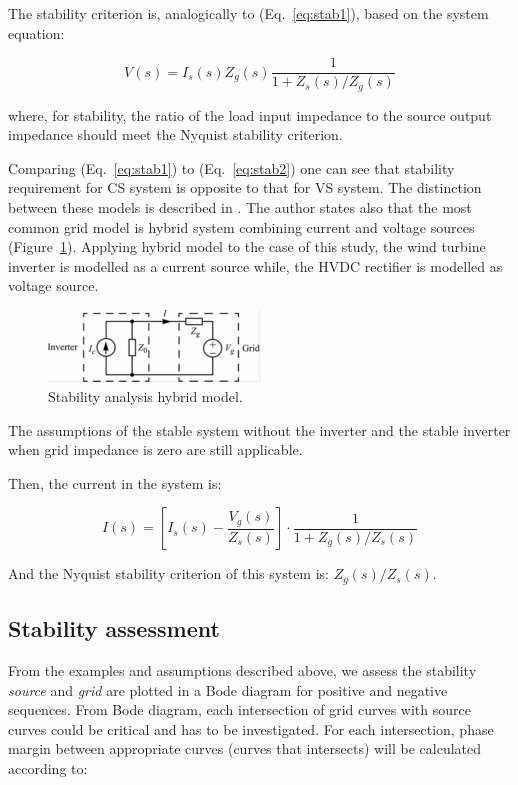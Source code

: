 \documentclass[12pt]{report} %
\begin{document}
The stability criterion is, analogically to (Eq.~\ref{eq:stab1}), based on the system equation:

\begin{equation} \label{eq:stab2}
	V(s)=I_s (s)Z_g (s) \dfrac{1}{1+Z_s (s)/Z_g (s)}
\end{equation}

where, for stability, the ratio of the load input impedance to the source output impedance should meet the Nyquist stability criterion.

Comparing (Eq.~\ref{eq:stab1}) to (Eq.~\ref{eq:stab2}) one can see that stability requirement for CS system is opposite to that for VS system. The distinction between these models is described in \cite{sun2011}. The author states also that the most common grid model is hybrid system combining current and voltage sources (Figure~\ref{fig:stabilitymodel3}). Applying hybrid model to the case of this study, the wind turbine inverter is modelled as a current source while, the HVDC rectifier is modelled as voltage source.

\begin{figure}[htb]
	\centering
    	\includegraphics[width=0.5\textwidth]{img/theory/stability_model3.png}
  	\caption{Stability analysis hybrid model.}
  	\label{fig:stabilitymodel3}
\end{figure}
\FloatBarrier

The assumptions of the stable system without the inverter and the stable inverter when grid impedance is zero are still applicable.

Then, the current in the system is:

\begin{equation} \label{eq:stab3}
	I(s)=\left [ I_s(s)-\frac{V_g (s)}{Z_s (s)} \right ]\cdot \frac{1}{1+Z_g (s)/Z_s (s)}
\end{equation}

And the Nyquist stability criterion of this system is: $Z_g (s)/Z_s (s)$.

\subsection{Stability assessment} \label{sec:stabilityassessment}
From the examples and assumptions described above, we assess the stability \textit{source} and \textit{grid} are plotted in a Bode diagram for positive and negative sequences. From Bode diagram, each intersection of grid curves with source curves could be critical and has to be investigated. For each intersection, phase margin between appropriate curves (curves that intersects) will be calculated according to:
\end{document}
